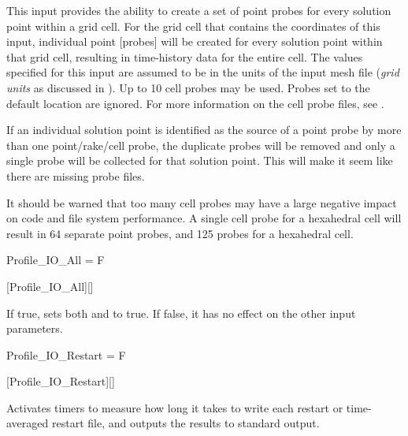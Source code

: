 \begin{nmldescbody}
This input provides the ability to create a set of point probes for every
solution point within a grid cell.
%
For the grid cell that contains the coordinates of this input, individual point
[probes] will be created for every solution point within
that grid cell, resulting in time-history data for the entire cell.
%
The values specified for this input are assumed to be in the units of the input
mesh file (\thatis \emph{grid units} as discussed in ).
%
Up to 10 cell probes may be used.
%
Probes set to the default location are ignored.
%
For more information on the cell probe files, see
.

\NOTE
If an individual solution point is identified as the source of a point probe by
more than one point\slash rake\slash cell probe, the duplicate probes will be
removed and only a single probe will be collected for that solution point.
%
This will make it seem like there are missing probe files.

\NOTE
It should be warned that too many cell probes may have a large negative impact
on code and file system performance.
%
A single cell probe for a \PO[3] hexahedral cell will result in 64 separate
point probes, and 125 probes for a \PO[4] hexahedral cell.
\end{nmldescbody}


\begin{nmldescitem}
Profile_IO_All = F
\end{nmldescitem}
[Profile\_IO\_All][]

\begin{nmldescbody}
If true, sets both
   and
to true.
%
If false, it has no effect on the other input parameters.
\end{nmldescbody}


\begin{nmldescitem}
Profile_IO_Restart = F
\end{nmldescitem}
[Profile\_IO\_Restart][]

\begin{nmldescbody}
Activates timers to measure how long it takes to write each restart or
time-averaged restart file, and outputs the results to standard output.
\end{nmldescbody}

